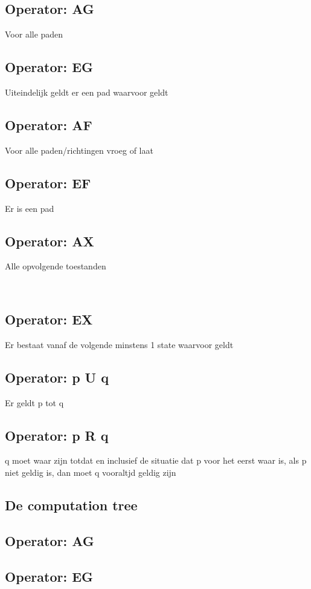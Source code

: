  
 
 
 \subsection{Operator: AG}
 Voor alle paden
 
 
 \subsection{Operator: EG}
 Uiteindelijk geldt er een pad waarvoor geldt
 
 \subsection{Operator: AF}
 Voor alle paden/richtingen vroeg of laat
 \subsection{Operator: EF}
 Er is een pad
 \subsection{Operator: AX}
 Alle opvolgende toestanden
 
 ~\cite{locke_2020}
 \subsection{Operator: EX}
 Er bestaat vanaf de volgende minstens 1 state waarvoor geldt
 \subsection{Operator: p U q}
 Er geldt p tot q
 ~\cite{gnsguides}
 \subsection{Operator: p R q}
 q moet waar zijn totdat en inclusief de situatie dat p voor het eerst waar is, als p niet geldig is, dan moet q vooraltjd geldig zijn
 
 
 \subsection{De computation tree}
 
 \subsection{Operator: AG}
 
 \subsection{Operator: EG}
 
